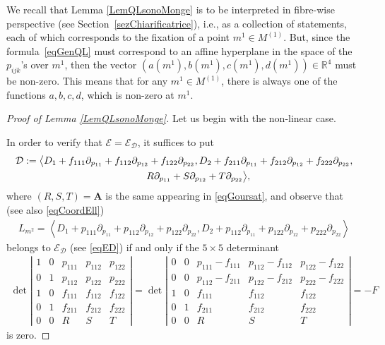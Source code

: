 \documentclass[10pt,a4paper]{amsart}
\newcommand{\R}{\mathbb{R}}
\newcommand{\D}{\mathcal{D}}
\newcommand{\E}{\mathcal{E}}
\newcommand{\Span}[1]{\left\langle #1 \right\rangle}
\numberwithin{equation}{section}
\begin{document}
We recall that Lemma \ref{LemQLsonoMonge} is to be interpreted in f\/ibre-wise perspective (see Section~\ref{sezChiarificatrice}), i.e., as a collection of statements, each of which corresponds to the f\/ixation of a point $m^1\in M^{(1)}$. But, since the formula~\eqref{eqGenQL} must correspond to an af\/f\/ine hyperplane in the space of the $p_{ijk}$'s over $m^1$, then the vector $(a(m^1),b(m^1),c(m^1),d(m^1))\in\R^4 $ must be non-zero. This means that for any $m^1\in M^{(1)}$, there is always one of the functions $a,b,c,d$, which is non-zero at $m^1$.

\begin{proof}[Proof of Lemma \ref{LemQLsonoMonge}]
Let us begin with the non-linear case.

In order to verify that $\E=\E_\D$, it suf\/f\/ices to put
\begin{gather}
\D:= \big\langle D_1 + f_{111}\partial_{p_{11}} + f_{112}\partial_{p_{12}} + f_{122}\partial_{p_{22}}, D_2 + f_{211}\partial_{p_{11}} + f_{212}\partial_{p_{12}} + f_{222}\partial_{p_{22}},\nonumber \\
\hphantom{\D:=\big\langle}{} R\partial_{p_{11}}+S\partial_{p_{12}}+T\partial_{p_{22}}\big\rangle,\label{eq.D.Goursat.nonlin}
\end{gather}
where $(R,S,T)=\boldsymbol{A}$ is the same appearing in \eqref{eqGoursat}, and
observe that (see also \eqref{eqCoordEll})
 \begin{gather*}
L_{m^2}=\Span{ D_1+ p_{111}\partial_{p_{11}}+p_{112}\partial_{p_{12}}+p_{122}\partial_{p_{22}}, D_2 + p_{112}\partial_{p_{11}}+p_{122}\partial_{p_{12}}+p_{222}\partial_{p_{22}} }
\end{gather*}
belongs to $\E_{\D}$ (see \eqref{eqED}) if and only if the $5\times 5$ determinant
\begin{gather*}%
\det\left|\begin{matrix}
1 & 0 & p_{111} & p_{112} & p_{122}
\\
0 & 1 & p_{112} & p_{122} & p_{222}
\\
1 & 0 & f_{111} & f_{112} & f_{122}
\\
0 & 1 & f_{211} & f_{212} & f_{222}
\\
0 & 0 & R & S & T
\end{matrix}\right|
=
\det \left|
\begin{matrix}
0 & 0 & p_{111}-f_{111} & p_{112} -f_{112}& p_{122} -f_{122}
\\
0 & 0 & p_{112}-f_{211} & p_{122}-f_{212} & p_{222}-f_{222}
\\
1 & 0 & f_{111} & f_{112} & f_{122}
\\
0 & 1 & f_{211} & f_{212} & f_{222}
\\
0 & 0 & R & S & T
\end{matrix}\right|=-F
\end{gather*}
is zero.


\end{proof}
\end{document}

